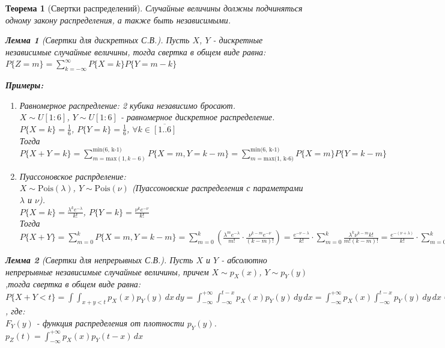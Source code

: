 \documentclass[14pt]{extarticle}
\theoremstyle{breakstyle}
\newtheorem{theorem}{Теорема}[subsection]
\newtheorem{lemma}{Лемма}[subsection]
\begin{document}
\begin{theorem}[Свертки распределений]

Случайные величины должны подчиняться одному закону распределения, а также быть независимыми.

\begin{lemma}[Свертки для дискретных С.В.]
Пусть $X$, $Y$ - дискретные независимые случайные величины, тогда свертка в общем виде равна:\\
$P\{Z = m\} = \sum_{k=-\infty}^{\infty}P\{X=k\}P\{Y=m-k\}$

\vspace{\baselineskip}

\textbf{Примеры:}
\begin{enumerate}
    \item Равномерное распредление: 2 кубика независимо бросают.\\
          $X \sim U[1:6]$, $Y \sim U[1:6]$ - равномерное дискретное распределение.\\
          $P\{X=k\} = \frac{1}{6}$, $P\{Y=k\} = \frac{1}{6}$, $\forall k \in \overline{[1..6]}$\\
          Тогда $P\{X+Y=k\} = \sum_{m = \text{max}(1, k-6)}^{\text{min(6, k-1)}}P\{X=m, Y=k-m\}=\sum_{m = \text{max(1, k-6)}}^{\text{min(6, k-1)}}P\{X=m\}P\{Y=k-m\}$

    \item Пуассоновское распрделение: \\
          $X \sim \text{Pois}(\lambda)$, $Y \sim \text{Pois}(\nu)$ (Пуассоновские распределения с параметрами $\lambda$ и $\nu$).\\
          $P\{X=k\} = \frac{\lambda^{k} e^{-\lambda}}{k!}$, $P\{Y=k\} = \frac{\nu^{k}e^{-\nu}}{k!}$\\
          Тогда $P\{X+Y\} = \sum_{m=0}^{k}P\{X=m, Y=k-m\} = \sum_{m=0}^{k}(\frac{\lambda^{m}e^{-\lambda}}{m!} \cdot \frac{\nu ^ {k - m} e^{-\nu}}{(k-m)!}) = \frac{e^{-\nu-\lambda}}{k!} \cdot \sum_{m=0}^{k}\frac{\lambda^{k}\nu^{k-m}k!}{m!(k-m)!} = \frac{e^{-(\nu + \lambda)}}{k!} \cdot \sum_{m = 0}^{k}C_{k}^{m}\lambda^{m}\nu^{k-m} = \frac{e^{-(\nu + \lambda)}}{k!}(\lambda + \nu)^{k}$

\end{enumerate}

\end{lemma}

\begin{lemma}[Свертки для непрерывных С.В.]
Пусть $X$ и $Y$ - абсолютно непрерывные независимые случайные величины, причем $X \sim p_{X}(x)$, $Y \sim p_{Y}(y)$,тогда свертка в общем виде равна:\\
$P\{X+Y < t\} = \int \int_{x+y < t} p_{X}(x)p_{Y}(y) \, dx \, dy = \int_{-\infty}^{+\infty} \int_{-\infty}^{t-x}p_{X}(x)p_{Y}(y) \, dy \, dx = \int_{-\infty}^{+\infty} p_{X}(x) \int_{-\infty}^{t-x}p_{Y}(y) \, dy \, dx = \int_{-\infty}^{+\infty} p_{X}(x)F_{Y}(t-x) \, dx$, где:\\
$F_{Y}(y)$ - функция распределения от плотности $p_{Y}(y)$.\\
$p_{Z}(t) = \int_{-\infty}^{+\infty} p_{X}(x)p_{Y}(t - x) \, dx$



\end{lemma}
\end{theorem}
\end{document}
